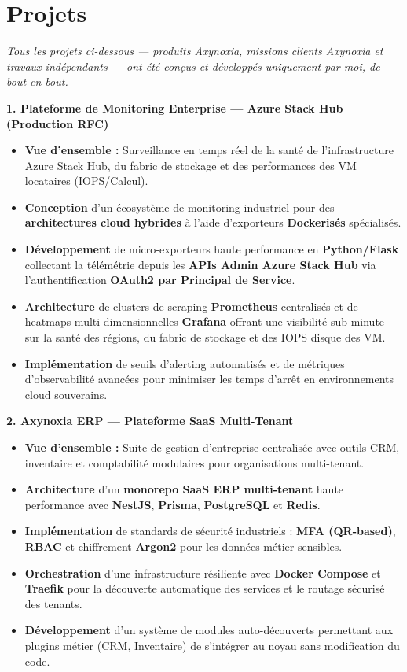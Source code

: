 \documentclass[10pt, letterpaper]{article}
\newenvironment{highlights}{
\begin{itemize}[leftmargin=12pt, itemsep=2pt]
}{
\end{itemize}
}
\begin{document}
\section{Projets}
\textit{Tous les projets ci-dessous --- produits Axynoxia, missions clients Axynoxia et travaux indépendants --- ont été conçus et développés uniquement par moi, de bout en bout.}

\textbf{1. Plateforme de Monitoring Enterprise --- Azure Stack Hub (Production RFC)}
\begin{highlights}
\item \textbf{Vue d'ensemble :} Surveillance en temps réel de la santé de l'infrastructure Azure Stack Hub, du fabric de stockage et des performances des VM locataires (IOPS/Calcul).
\item \textbf{Conception} d'un écosystème de monitoring industriel pour des \textbf{architectures cloud hybrides} à l'aide d'exporteurs \textbf{Dockerisés} spécialisés.
\item \textbf{Développement} de micro-exporteurs haute performance en \textbf{Python/Flask} collectant la télémétrie depuis les \textbf{APIs Admin Azure Stack Hub} via l'authentification \textbf{OAuth2 par Principal de Service}.
\item \textbf{Architecture} de clusters de scraping \textbf{Prometheus} centralisés et de heatmaps multi-dimensionnelles \textbf{Grafana} offrant une visibilité sub-minute sur la santé des régions, du fabric de stockage et des IOPS disque des VM.
\item \textbf{Implémentation} de seuils d'alerting automatisés et de métriques d'observabilité avancées pour minimiser les temps d'arrêt en environnements cloud souverains.
\end{highlights}

\textbf{2. Axynoxia ERP --- Plateforme SaaS Multi-Tenant}
\begin{highlights}
\item \textbf{Vue d'ensemble :} Suite de gestion d'entreprise centralisée avec outils CRM, inventaire et comptabilité modulaires pour organisations multi-tenant.
\item \textbf{Architecture} d'un \textbf{monorepo SaaS ERP multi-tenant} haute performance avec \textbf{NestJS}, \textbf{Prisma}, \textbf{PostgreSQL} et \textbf{Redis}.
\item \textbf{Implémentation} de standards de sécurité industriels : \textbf{MFA (QR-based)}, \textbf{RBAC} et chiffrement \textbf{Argon2} pour les données métier sensibles.
\item \textbf{Orchestration} d'une infrastructure résiliente avec \textbf{Docker Compose} et \textbf{Traefik} pour la découverte automatique des services et le routage sécurisé des tenants.
\item \textbf{Développement} d'un système de modules auto-découverts permettant aux plugins métier (CRM, Inventaire) de s'intégrer au noyau sans modification du code.
\end{highlights}
\end{document}
